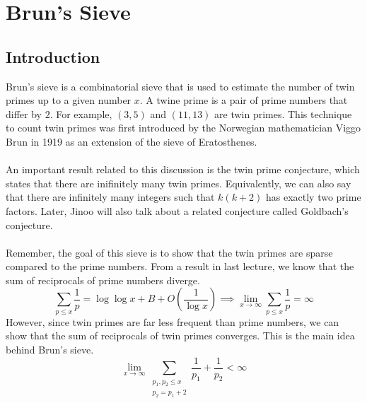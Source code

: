 \documentclass[8pt]{extarticle}
\begin{document}
\section{Brun's Sieve}
\subsection{Introduction}
Brun's sieve is a combinatorial sieve that is used to estimate the number of twin primes up to a given number $x$. A twine prime is a pair of prime numbers that differ by $2$. For example, $(3,5)$ and $(11,13)$ are twin primes. 
This technique to count twin primes was first introduced by the Norwegian mathematician Viggo Brun in 1919 as an extension of the sieve of Eratosthenes.\\
\\
An important result related to this discussion is the twin prime conjecture, which states that there are inifinitely many twin primes. Equivalently, we can also say that there are infinitely many integers such that $k(k+2)$ has exactly two prime factors. Later, Jinoo will also talk about a related conjecture called Goldbach's conjecture. \\
\\
Remember, the goal of this sieve is to show that the twin primes are sparse compared to the prime numbers. From a result in last lecture, we know that the sum of reciprocals of prime numbers diverge.
$$
\sum_{p \leq x} \frac{1}{p} = \log \log x + B + O\left(\frac{1}{\log x}\right) \implies \lim_{x\rightarrow\infty} \sum_{p \leq x} \frac{1}{p} = \infty
$$
However, since twin primes are far less frequent than prime numbers, we can show that the sum of reciprocals of twin primes converges. This is the main idea behind Brun's sieve.
$$
\lim_{x\rightarrow \infty} \sum_{\substack{p_1, p_2 \leq x \\ p_2 = p_1 + 2}} \frac{1}{p_1} + \frac{1}{p_2} < \infty
$$
\end{document}
